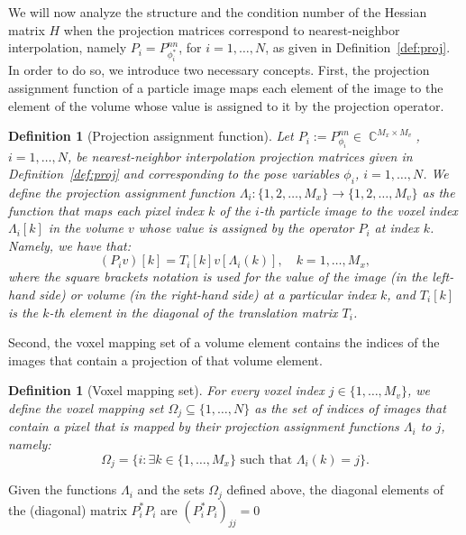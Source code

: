\documentclass{article}
\DeclareMathOperator{\Cb}{\mathbb{C}}
\newtheorem{definition}[theorem]{Definition}
\begin{document}
We will now analyze the structure and the condition number of the Hessian matrix 
$H$ when the projection matrices correspond to nearest-neighbor interpolation,
namely $P_i = P_{\phi_i^*}^{nn}$, for $i=1,\ldots,N$, 
as given in Definition~\ref{def:proj}.
In order to do so, we introduce two necessary concepts. First, the projection 
assignment function of a particle image maps each element of the image to the 
element of the volume whose value is assigned to it by the projection operator.
\begin{definition}[Projection assignment function]
    Let $P_i := P_{\phi_i}^{nn} \in \Cb^{M_x \times M_v}$, $i=1,\ldots,N$, be nearest-neighbor
    interpolation projection matrices given in Definition~\ref{def:proj} and
    corresponding to the pose variables $\phi_i$, $i=1,\ldots,N$.
    We define the projection assignment function 
    $\Lambda_i : \{1,2,\ldots,M_x\} \to \{1,2,\ldots,M_v \}$ as the function that 
    maps each pixel index $k$ of the $i$-th particle image to the voxel index 
    $\Lambda_i[k]$ in the volume $v$ whose value is assigned by the operator 
    $P_i$ at index $k$. Namely, we have that:
    \begin{equation*}
        (P_i v) [k] = T_i[k] v[\Lambda_i(k)],
        \quad
        k = 1,\ldots,M_x,
    \end{equation*}
    where the square brackets notation is used for the value of the image (in the 
    left-hand side) or volume (in the right-hand side) at a particular index $k$, 
    and $T_i[k]$ is the $k$-th element in the diagonal of the translation matrix $T_i$. 
\end{definition}
Second, the voxel mapping set of a volume element contains the indices of the 
images that contain a projection of that volume element.
\begin{definition}[Voxel mapping set]
    For every voxel index $j \in \{1,\ldots,M_v\}$, we define the voxel mapping 
    set $\Omega_j \subseteq \{1,\ldots,N\}$ as the set of indices of 
    images that contain a pixel that is mapped by their projection assignment 
    functions $\Lambda_i$ to $j$, namely:
    \begin{equation*}
        \Omega_j = \{i : \exists k \in \{1,\ldots,M_x\} 
        \text{ such that } \Lambda_i(k) = j\}.
    \end{equation*}
\end{definition}
Given the functions $\Lambda_i$ and the sets $\Omega_j$ defined above, the diagonal 
elements of the (diagonal) matrix $P_i^* P_i$  are $(P_i^* P_i)_{jj} = 0$ 
\end{document}

